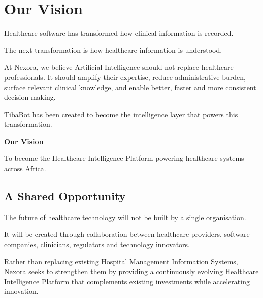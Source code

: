 
\chapter*{Our Vision}

Healthcare software has transformed how clinical information is recorded.

The next transformation is how healthcare information is understood.

At Nexora, we believe Artificial Intelligence should not replace healthcare professionals. It should amplify their expertise, reduce administrative burden, surface relevant clinical knowledge, and enable better, faster and more consistent decision-making.

TibaBot has been created to become the intelligence layer that powers this transformation.

\vspace{6mm}

\begin{callout}

\centering

\Huge

\textbf{Our Vision}

\vspace{5mm}

\Large

To become the Healthcare Intelligence Platform powering healthcare systems across Africa.

\end{callout}


\section{A Shared Opportunity}

The future of healthcare technology will not be built by a single organisation.

It will be created through collaboration between healthcare providers, software companies, clinicians, regulators and technology innovators.

Rather than replacing existing Hospital Management Information Systems, Nexora seeks to strengthen them by providing a continuously evolving Healthcare Intelligence Platform that complements existing investments while accelerating innovation.

